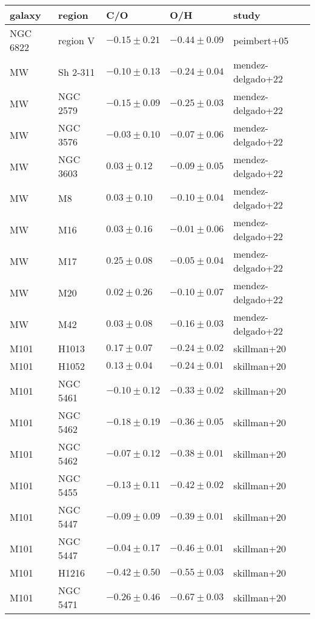 \documentclass[11pt]{article}
\begin{document}
\begin{table}
    \caption{RL derived abundances for MW and nearby galaxies
        note that mendez--delgado uses RL oxygen from esteban+05, +09
    }

    \begin{longtable}{lllll}
    \hline
    galaxy & region & C/O & O/H & study \\
    \hline
    NGC 6822 & region V & $-0.15 \pm 0.21$ & $-0.44 \pm 0.09$ & peimbert+05 \\
    MW & Sh 2-311 & $-0.10 \pm 0.13$ & $-0.24 \pm 0.04$ & mendez-delgado+22 \\
    MW & NGC 2579 & $-0.15 \pm 0.09$ & $-0.25 \pm 0.03$ & mendez-delgado+22 \\
    MW & NGC 3576 & $-0.03 \pm 0.10$ & $-0.07 \pm 0.06$ & mendez-delgado+22 \\
    MW & NGC 3603 & $0.03 \pm 0.12$ & $-0.09 \pm 0.05$ & mendez-delgado+22 \\
    MW & M8 & $0.03 \pm 0.10$ & $-0.10 \pm 0.04$ & mendez-delgado+22 \\
    MW & M16 & $0.03 \pm 0.16$ & $-0.01 \pm 0.06$ & mendez-delgado+22 \\
    MW & M17 & $0.25 \pm 0.08$ & $-0.05 \pm 0.04$ & mendez-delgado+22 \\
    MW & M20 & $0.02 \pm 0.26$ & $-0.10 \pm 0.07$ & mendez-delgado+22 \\
    MW & M42 & $0.03 \pm 0.08$ & $-0.16 \pm 0.03$ & mendez-delgado+22 \\
    M101 & H1013 & $0.17 \pm 0.07$ & $-0.24 \pm 0.02$ & skillman+20 \\
    M101 & H1052 & $0.13 \pm 0.04$ & $-0.24 \pm 0.01$ & skillman+20 \\
    M101 & NGC 5461 & $-0.10 \pm 0.12$ & $-0.33 \pm 0.02$ & skillman+20 \\
    M101 & NGC 5462 & $-0.18 \pm 0.19$ & $-0.36 \pm 0.05$ & skillman+20 \\
    M101 & NGC 5462 & $-0.07 \pm 0.12$ & $-0.38 \pm 0.01$ & skillman+20 \\
    M101 & NGC 5455 & $-0.13 \pm 0.11$ & $-0.42 \pm 0.02$ & skillman+20 \\
    M101 & NGC 5447 & $-0.09 \pm 0.09$ & $-0.39 \pm 0.01$ & skillman+20 \\
    M101 & NGC 5447 & $-0.04 \pm 0.17$ & $-0.46 \pm 0.01$ & skillman+20 \\
    M101 & H1216 & $-0.42 \pm 0.50$ & $-0.55 \pm 0.03$ & skillman+20 \\
    M101 & NGC 5471 & $-0.26 \pm 0.46$ & $-0.67 \pm 0.03$ & skillman+20 \\

\end{longtable}
\end{table}
\end{document}
